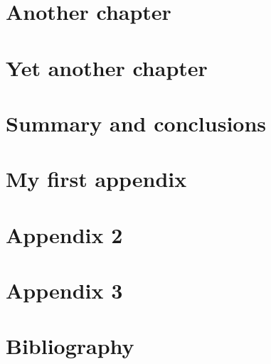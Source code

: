 \chapter{Another chapter} \label{chapter:another-chapter}

\chapter{Yet another chapter}

\chapter{Summary and conclusions}

\begin{appendix}

    \makeatletter
    \makeatother
    
    \chapter{My first appendix}
    
    
    \chapter{Appendix 2}
    
    \chapter{Appendix 3}


\end{appendix}


\chapter*{Bibliography}
\printbibliography[heading = none]


